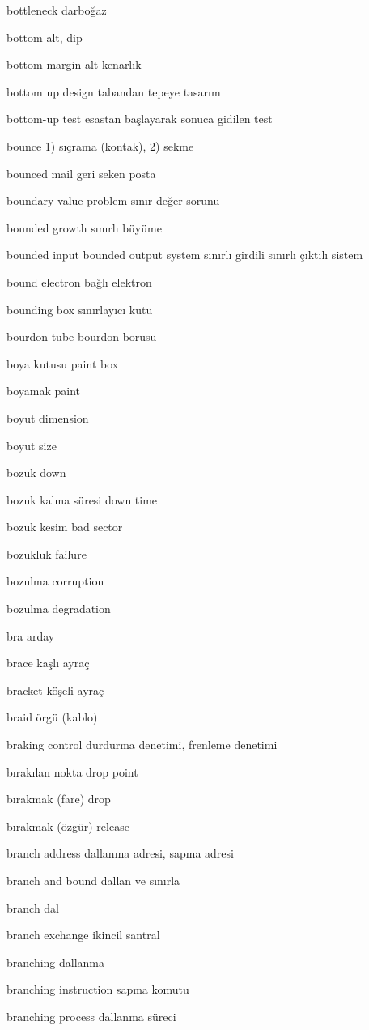 \documentclass[12pt,fleqn]{article}\usepackage{../../common}
\begin{document}
bottleneck darboğaz

bottom alt, dip

bottom margin alt kenarlık

bottom up design tabandan tepeye tasarım

bottom-up test esastan başlayarak sonuca gidilen test

bounce 1) sıçrama (kontak), 2) sekme

bounced mail geri seken posta

boundary value problem sınır değer sorunu

bounded growth sınırlı büyüme

bounded input bounded output system sınırlı girdili sınırlı çıktılı sistem

bound electron bağlı elektron

bounding box sınırlayıcı kutu

bourdon tube bourdon borusu

boya kutusu paint box

boyamak paint

boyut dimension

boyut size

bozuk down

bozuk kalma süresi down time

bozuk kesim bad sector

bozukluk failure

bozulma corruption

bozulma degradation

bra arday

brace kaşlı ayraç

bracket köşeli ayraç

braid örgü (kablo)

braking control durdurma denetimi, frenleme denetimi

bırakılan nokta drop point

bırakmak (fare) drop

bırakmak (özgür) release

branch address dallanma adresi, sapma adresi

branch and bound dallan ve sınırla

branch dal

branch exchange ikincil santral

branching dallanma

branching instruction sapma komutu

branching process dallanma süreci
\end{document}
